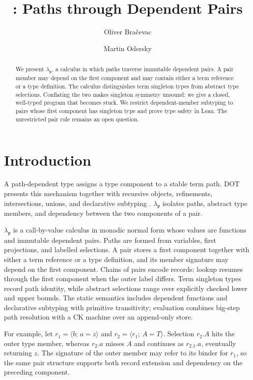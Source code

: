 \documentclass[acmsmall,screen,nonacm]{acmart}
\title{\texorpdfstring{\lambdap}{lambda-p}: Paths through Dependent Pairs}
\author{Oliver Bra\v{c}evac}
\author{Martin Odersky}
\newcommand{\lambdap}{\ensuremath{\lambda_{\mathsf p}}}
\newcommand{\pairval}[3]{\langle #1;\,#2=#3\rangle}
\begin{document}
\begin{abstract}
We present \lambdap{}, a calculus in which paths traverse immutable dependent
pairs. A pair member may depend on the first component and may contain either
a term reference or a type definition. The calculus distinguishes term
singleton types from abstract type selections. Conflating the two makes
singleton symmetry unsound: we give a closed, well-typed program that becomes
stuck. We restrict dependent-member subtyping to pairs whose first component
has singleton type and prove type safety in Lean. The unrestricted pair rule
remains an open question.
\end{abstract}


\maketitle

\section{Introduction}

A path-dependent type assigns a type component to a stable term path. DOT
presents this mechanism together with recursive objects, refinements,
intersections, unions, and declarative subtyping
\citep{amin2014foundations,rompf2016dot}. \lambdap{} isolates paths, abstract
type members, and dependency between the two components of a pair.

\lambdap{} is a call-by-value calculus in monadic normal form whose values are
functions and immutable dependent pairs. Paths are formed from variables,
first projections, and labelled selections. A pair stores a first component
together with either a term reference or a type definition, and its member
signature may depend on the first component. Chains of pairs encode records:
lookup resumes through the first component when the outer label differs. Term
singleton types record path identity, while abstract selections range over
explicitly checked lower and upper bounds. The static semantics includes
dependent functions and declarative subtyping with primitive transitivity;
evaluation combines big-step path resolution with a CK machine over an
append-only store.

For example, let \(r_1=\pairval{b}{a}{z}\) and
\(r_2=\pairval{r_1}{A}{T}\). Selection \(r_2.A\) hits the outer type member,
whereas \(r_2.a\) misses \(A\) and continues as \(r_2.1.a\), eventually
returning \(z\). The signature of the outer member may refer to its binder for
\(r_1\), so the same pair structure supports both record extension and
dependency on the preceding component.
\end{document}
